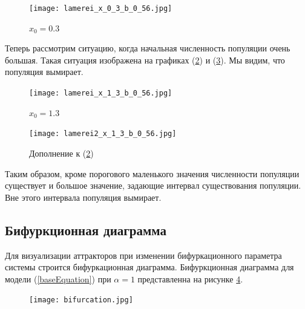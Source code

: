         \begin{figure}
            \centering
            \texttt{[image: lamerei\_x\_0\_3\_b\_0\_56.jpg]}
    
            \captionsetup{justification=centering}
            \caption{\(x_0 = 0.3\)}
            \label{lamerei_x_0_3_b_0_56}
        \end{figure}
    
        Теперь рассмотрим ситуацию, когда начальная численность популяции очень большая. Такая ситуация изображена на графиках (\ref{lamerei_x_1_3_b_0_56}) и (\ref{lamerei2_x_1_3_b_0_56}). Мы видим, что популяция вымирает.
            
        \begin{figure}
            \centering
            \texttt{[image: lamerei\_x\_1\_3\_b\_0\_56.jpg]}
    
            \captionsetup{justification=centering}
            \caption{\(x_0 = 1.3\)}
            \label{lamerei_x_1_3_b_0_56}
        \end{figure}
            
        \begin{figure}
            \centering
            \texttt{[image: lamerei2\_x\_1\_3\_b\_0\_56.jpg]}
    
            \captionsetup{justification=centering}
            \caption{Дополнение к (\ref{lamerei_x_1_3_b_0_56})}
            \label{lamerei2_x_1_3_b_0_56}
        \end{figure}

        Таким образом, кроме порогового маленького значения численности популяции существует и большое значение, задающие интервал существования популяции. Вне этого интервала популяция вымирает. 

    \subsection{Бифуркционная диаграмма}    

        Для визуализации аттракторов при изменении бифуркационного параметра системы строится бифуркационная диаграмма. Бифуркционная диаграмма для модели (\ref{baseEquation}) при \(\alpha = 1\) представленна на рисунке \ref{bifurcation}.

        \begin{figure}
            \centering
            \texttt{[image: bifurcation.jpg]}

            \captionsetup{justification=centering}
            \caption{}
            \label{bifurcation}
        \end{figure}

